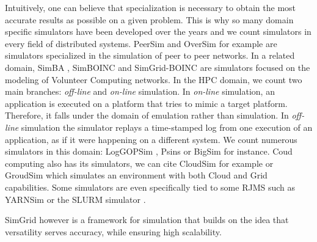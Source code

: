 Intuitively, one can believe that specialization is necessary to obtain the
most accurate results as possible on a given problem. This is why so many
domain specific simulators have been developed over the years and we count
simulators in every field of distributed systems.  PeerSim \cite{p2p09-peersim}
and OverSim \cite{baumgart2009oversim} for example are simulators specialized
in the simulation of peer to peer networks. In a related domain, SimBA
\cite{simBA}, SimBOINC \cite{kondo2007simboinc} and SimGrid-BOINC
\cite{simgrid-boinc} are simulators focused on the modeling of Volunteer
Computing networks. In the HPC domain, we count two main branches:
\textit{off-line} and \textit{on-line} simulation. In \textit{on-line}
simulation, an application is executed on a platform that tries to mimic a
target platform. Therefore, it falls under the domain of emulation rather than
simulation. In \textit{off-line} simulation the simulator replays a
time-stamped log from one execution of an application, as if it were happening
on a different system. We count numerous simulators in this domain: LogGOPSim
\cite{loggopsim}, Psins \cite{Psins} or BigSim \cite{bigsim} for instance. Coud
computing also has its simulators, we can cite CloudSim \cite{cloudsim} for
example or GroudSim \cite{groudsim} which simulates an environment with both
Cloud and Grid capabilities. Some simulators are even specifically tied to some
RJMS such as YARNSim \cite{7152529} or the SLURM simulator
\cite{slurm-simulator}.

SimGrid \cite{casanova:hal-01017319} however is a framework for simulation that
builds on the idea that versatility serves accuracy, while ensuring high
scalability.


